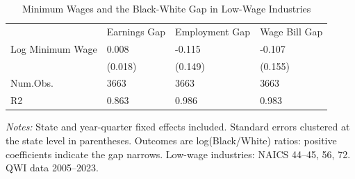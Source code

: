 \begin{table}[!htbp]
\centering
\caption{Minimum Wages and the Black-White Gap in Low-Wage Industries}
\label{tab:main}
\begin{threeparttable}
\begin{tabular}{llll}
& Earnings Gap & Employment Gap & Wage Bill Gap \\
Log Minimum Wage & 0.008 & -0.115 & -0.107 \\
& (0.018) & (0.149) & (0.155) \\
Num.Obs. & 3663 & 3663 & 3663 \\
R2 & 0.863 & 0.986 & 0.983 \\
\end{tabular}
\begin{tablenotes}[flushleft]
\small
\item \textit{Notes:} State and year-quarter fixed effects included. Standard errors clustered at the state level in parentheses. Outcomes are log(Black/White) ratios: positive coefficients indicate the gap narrows. Low-wage industries: NAICS 44--45, 56, 72. QWI data 2005--2023.
\end{tablenotes}
\end{threeparttable}
\end{table}
